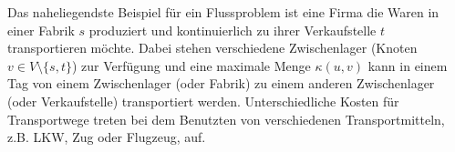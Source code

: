 Das naheliegendste Beispiel f\"ur ein Flussproblem ist eine 
Firma die Waren in einer Fabrik $s$ produziert und 
kontinuierlich zu ihrer Verkaufstelle $t$ transportieren m\"ochte. 
Dabei stehen verschiedene Zwischenlager 
(Knoten $v \in V \setminus \{s,t\}$)  zur Verf\"ugung und eine 
maximale Menge $\kappa(u,v)$ kann in einem Tag von einem 
Zwischenlager (oder Fabrik) zu einem anderen Zwischenlager 
(oder Verkaufstelle) transportiert werden. Unterschiedliche Kosten
f\"ur Transportwege treten bei dem Benutzten von verschiedenen 
Transportmitteln, z.B. LKW, Zug oder Flugzeug, auf. \cite{schoening, algo}

%
%


